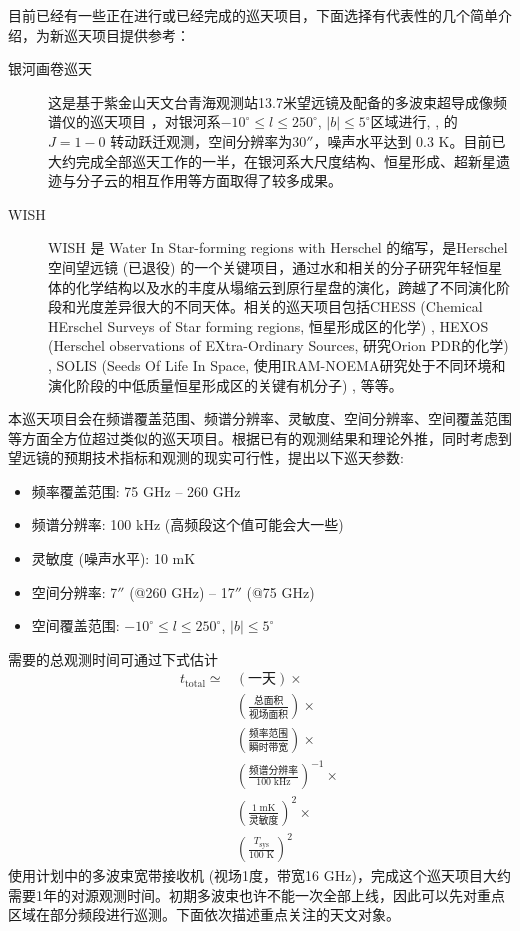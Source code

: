 \documentclass{report}
\newcommand\Hii{H\;\textsc{ii}}
\begin{document}
目前已经有一些正在进行或已经完成的巡天项目，下面选择有代表性的几个简单介绍，为新巡天项目提供参考：
\begin{description}
  \item[银河画卷巡天] 这是基于紫金山天文台青海观测站13.7米望远镜及配备的多波束超导成像频谱仪的巡天项目 \citep{Lu2018}，对银河系$-10^\circ\le l\le 250^\circ$, $|b|\le5^\circ$区域进行, , 的 $J=1{-}0$ 转动跃迁观测，空间分辨率为$30''$，噪声水平达到 0.3 K。目前已大约完成全部巡天工作的一半，在银河系大尺度结构、恒星形成、超新星遗迹与分子云的相互作用等方面取得了较多成果。
  \item[WISH] WISH 是 Water In Star-forming regions with Herschel 的缩写，是Herschel空间望远镜 (已退役) 的一个关键项目，通过水和相关的分子研究年轻恒星体的化学结构以及水的丰度从塌缩云到原行星盘的演化，跨越了不同演化阶段和光度差异很大的不同天体。相关的巡天项目包括CHESS (Chemical HErschel Surveys of Star forming regions, 恒星形成区的化学) \citep{Ceccarelli2010}, HEXOS (Herschel observations of EXtra-Ordinary Sources, 研究Orion PDR的化学) \citep{Bergin2010}, SOLIS (Seeds Of Life In Space, 使用IRAM-NOEMA研究处于不同环境和演化阶段的中低质量恒星形成区的关键有机分子) \citep{Ceccarelli2017}, 等等。
\end{description}  
本巡天项目会在频谱覆盖范围、频谱分辨率、灵敏度、空间分辨率、空间覆盖范围等方面全方位超过类似的巡天项目。根据已有的观测结果和理论外推，同时考虑到望远镜的预期技术指标和观测的现实可行性，提出以下巡天参数:
\begin{itemize}
  \item 频率覆盖范围: 75 GHz -- 260 GHz
  \item 频谱分辨率: 100 kHz (高频段这个值可能会大一些)
  \item 灵敏度 (噪声水平): 10 mK
  \item 空间分辨率: 7$''$ (@260 GHz) -- 17$''$ (@75 GHz)
  \item 空间覆盖范围: $-10^\circ\le l\le 250^\circ$, $|b|\le5^\circ$
\end{itemize}  
需要的总观测时间可通过下式估计
\begin{equation}
\begin{split}
  t_\text{total} \simeq
  & \left(\text{一天}\right) \times\\
  & \left(\frac{\text{总面积}}{\text{视场面积}}\right)\times \\
  & \left(\frac{\text{频率范围}}{\text{瞬时带宽}}\right)\times \\
  & \left(\frac{\text{频谱分辨率}}{100\;\text{kHz}}\right)^{-1}\times \\
  & \left(\frac{1\;\text{mK}}{\text{灵敏度}}\right)^2\times \\
  & \left(\frac{T_\text{sys}}{100\;\text{K}}\right)^2
\end{split} 
\end{equation} 
使用计划中的多波束宽带接收机 (视场1度，带宽16 GHz)，完成这个巡天项目大约需要1年的对源观测时间。初期多波束也许不能一次全部上线，因此可以先对重点区域在部分频段进行巡测。下面依次描述重点关注的天文对象。
\end{document}
